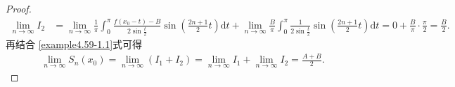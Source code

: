 \documentclass[../../main.tex]{subfiles}%
\begin{document}
\begin{proof}
\begin{align*}
\lim_{n\rightarrow \infty} I_2&=\lim_{n\rightarrow \infty} \frac{1}{\pi}\int_0^{\pi}{\frac{f(x_0 - t) - B}{2\sin \frac{t}{2}}\sin \left( \frac{2n + 1}{2}t \right) \mathrm{d}t}+\lim_{n\rightarrow \infty} \frac{B}{\pi}\int_0^{\pi}{\frac{1}{2\sin \frac{t}{2}}\sin \left( \frac{2n + 1}{2}t \right) \mathrm{d}t}
=0 + \frac{B}{\pi}\cdot \frac{\pi}{2}
=\frac{B}{2}.
\end{align*}
再结合 \eqref{example4.59-1.1}式可得
\begin{align*}
\lim_{n\rightarrow \infty} S_n(x_0)=\lim_{n\rightarrow \infty} (I_1 + I_2)
=\lim_{n\rightarrow \infty} I_1 + \lim_{n\rightarrow \infty} I_2
=\frac{A + B}{2}.
\end{align*}

\end{proof}
\end{document}
